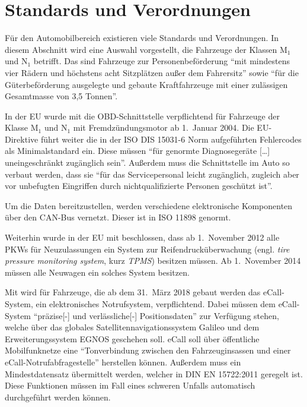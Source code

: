 \section{Standards und Verordnungen}\label{sec:standards}
Für den Automobilbereich existieren viele Standards und Verordnungen. In diesem
Abschnitt wird eine Auswahl vorgestellt, die Fahrzeuge der Klassen M$_1$ und
N$_1$ betrifft. Das sind Fahrzeuge zur Personenbeförderung
\enquote{mit mindestens vier Rädern und höchstens acht Sitzplätzen außer dem Fahrersitz}
sowie \enquote{für die Güterbeförderung ausgelegte und gebaute Kraftfahrzeuge
mit einer zulässigen Gesamtmasse von 3,5 Tonnen}\cite{Richtlinie70/156/EWG:Fahrzeugklassen}.

In der EU wurde mit \cite{EUDirective98/69/EC} die OBD-Schnittstelle
verpflichtend für Fahrzeuge der Klasse M$_1$ und N$_1$ mit Fremdzündungsmotor
ab 1.~Januar 2004. Die EU-Direktive führt weiter die in der ISO DIS 15031-6
Norm aufgeführten Fehlercodes als Minimalstandard ein. Diese müssen
\enquote{für genormte Diagnosegeräte [\dots] uneingeschränkt zugänglich sein}.
Außerdem muss die Schnittstelle im Auto so verbaut werden, dass sie
\enquote{für das Servicepersonal leicht zugänglich, zugleich aber vor
unbefugten Eingriffen durch nichtqualifizierte Personen geschützt ist}.

Um die Daten bereitzustellen, werden verschiedene elektronische Komponenten
über den CAN-Bus vernetzt. Dieser ist in ISO 11898 genormt.

Weiterhin wurde in der EU mit \cite{EURegulation661/2009} beschlossen, dass ab
1.~November 2012 alle PKWs für Neuzulassungen ein System zur
Reifendrucküberwachung (engl. \textit{tire pressure monitoring system}, kurz
\textit{TPMS}) besitzen müssen. Ab 1.~November 2014 müssen alle Neuwagen ein
solches System besitzen.

Mit \cite{EURegulation2015/ecall} wird für Fahrzeuge, die ab dem 31.~März 2018
gebaut werden das eCall-System, ein elektronisches Notrufsystem, verpflichtend.
Dabei müssen dem eCall-System \enquote{präzise[-] und verlässliche[-]
Positionsdaten} zur Verfügung stehen, welche über das globales
Satellitennavigationssystem Galileo und dem Erweiterungssystem EGNOS geschehen
soll. eCall soll über öffentliche Mobilfunknetze eine \enquote{Tonverbindung
zwischen den Fahrzeuginsassen und einer eCall-Notrufabfragestelle} herstellen
können. Außerdem muss ein Mindestdatensatz übermittelt werden, welcher in
DIN EN 15722:2011 geregelt ist. Diese Funktionen müssen im Fall eines schweren
Unfalls automatisch durchgeführt werden können.